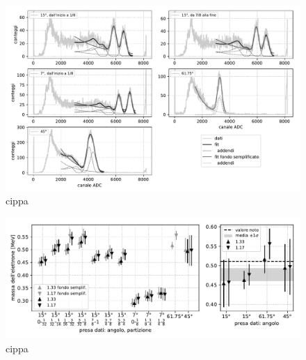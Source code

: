 \begin{figure}
	\hspace{-8em}\includegraphics[height=0.9\textwidth]{fit}
	\caption{\label{fig:fit}
	cippa}
\end{figure}

\begin{figure}
	\hspace{-7em}\includegraphics[width=50em]{me}
	\caption{\label{fig:me}
	cippa}
\end{figure}
